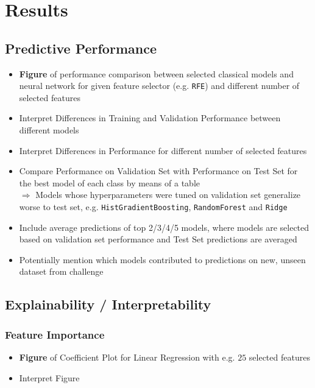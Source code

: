 \documentclass[12pt, letterpaper]{article}
\begin{document}

\section{Results} %


\subsection{Predictive Performance} %
\begin{itemize}
    \item \textbf{Figure} of performance comparison between selected classical models and neural network for given feature selector (e.g. \texttt{RFE}) and different number of selected features
    \item Interpret Differences in Training and Validation Performance between different models
    \item Interpret Differences in Performance for different number of selected features
    \item Compare Performance on Validation Set with Performance on Test Set for the best model of each class by means of a table \\
          $\Rightarrow$ Models whose hyperparameters were tuned on validation set generalize worse to test set, e.g. \texttt{HistGradientBoosting}, \texttt{RandomForest} and \texttt{Ridge}
    \item Include average predictions of top 2/3/4/5 models, where models are selected based on validation set performance and Test Set predictions are averaged
    \item Potentially mention which models contributed to predictions on new, unseen dataset from challenge
\end{itemize}


\subsection{Explainability / Interpretability} %

\subsubsection{Feature Importance} %
\begin{itemize}
    \item \textbf{Figure} of Coefficient Plot for Linear Regression with e.g. $25$ selected features
    \item Interpret Figure
\end{itemize}
\end{document}
